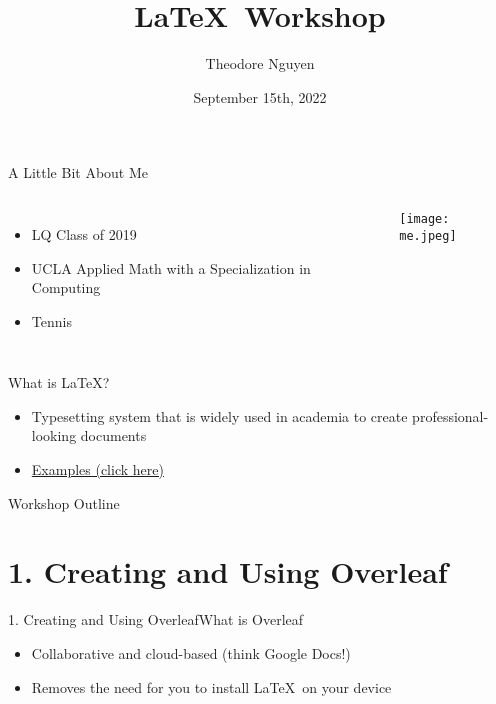 \documentclass[aspectratio=43]{beamer}
\title{\LaTeX \ Workshop}
\author{Theodore Nguyen}
\date{September 15th, 2022}
\begin{document}
\begin{frame}{}{}
    \maketitle
\end{frame}

\begin{frame}{A Little Bit About Me}{}
    \begin{columns}
            \begin{itemize}
                \item LQ Class of 2019
                \item UCLA Applied Math with a Specialization in Computing
                \item Tennis
            \end{itemize}
            \texttt{[image: me.jpeg]}
    \end{columns}
\end{frame}

\begin{frame}{What is \LaTeX?}
    \begin{center}
        \begin{itemize}
            \item<2-> {\Large Typesetting system that is widely used in academia
                to create professional-looking documents}
            \item<2->
                {\Large \href{https://github.com/theodoretnguyen/latex-workshop}{Examples
                (click here)}}
        \end{itemize}
        \medskip

    \end{center}
\end{frame}

\begin{frame}{Workshop Outline}
    \tableofcontents
\end{frame}

\section{1. Creating and Using Overleaf}
\begin{frame}{1. Creating and Using Overleaf}{What is Overleaf}
\begin{itemize}
    \item Collaborative and cloud-based (think Google Docs!)
    \item Removes the need for you to install \LaTeX \ on your device
\end{itemize}
\end{frame}
\end{document}
